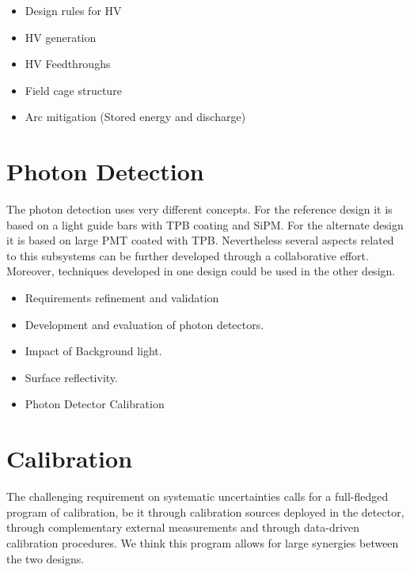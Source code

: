 \begin{itemize}

\item Design	
  rules	
  for	
  HV	
  
\item HV generation
  
\item HV Feedthroughs

\item Field cage structure

\item Arc	
  mitigation	
  (Stored	
  energy	
  and	
  discharge)	
  

\end{itemize}


 
\section{Photon Detection}

The photon detection uses very different concepts. For the reference design it is based on a light guide bars with TPB coating and SiPM. 
For the alternate design it is based on large PMT coated with TPB. Nevertheless several aspects related to this subsystems can be further developed through a collaborative effort.
Moreover, techniques developed in one design could be used in the other design. 

\begin{itemize}

\item Requirements refinement and validation	
  
\item Development and evaluation	  of	  photon	 detectors.	
  
\item Impact of  Background  light.	
    
\item  Surface reflectivity.	
  
\item Photon	 Detector  Calibration	

\end{itemize}




\section{Calibration}

The challenging requirement on systematic uncertainties calls for a full-fledged program of calibration, be it through calibration sources deployed in the detector, through complementary external measurements and through data-driven calibration procedures. We think this program allows for large synergies between the two designs. 

